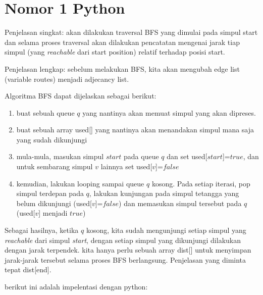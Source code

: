 \documentclass[12pt,letterpaper]{article}
\begin{document}
\section{Nomor 1 Python}
Penjelasan singkat: akan dilakukan traversal BFS yang dimulai pada simpul start dan selama proses traversal
akan dilakukan pencatatan mengenai jarak tiap simpul (yang \textit{reachable} dari start position) relatif terhadap posisi start.
\vline

 Penjelasan lengkap: sebelum melakukan BFS, kita akan mengubah edge list (variable routes) menjadi adjecancy list. 

Algoritma BFS dapat dijelaskan sebagai berikut:
\begin{enumerate}
    \item buat sebuah queue $q$ yang nantinya akan memuat simpul yang akan dipreses.
    \item buat sebuah array used[] yang nantinya akan menandakan simpul mana saja yang sudah dikunjungi
    \item  mula-mula, masukan simpul $start$ pada queue $q$ dan set used[$start$]=$true$, dan untuk sembarang simpul $v$ lainnya set used[$v$]=$false$
    \item kemudian, lakukan looping sampai queue $q$ kosong. Pada setiap iterasi, pop simpul terdepan pada $q$, lakukan kunjungan pada simpul tetangga yang belum dikunjungi (used[$v$]=$false$) dan memasukan simpul tersebut pada $q$ (used[$v$] menjadi $true$)
\end{enumerate}
Sebagai hasilnya, ketika $q$ kosong, kita sudah mengunjungi setiap simpul yang \textit{reachable} dari simpul \textit{start}, dengan setiap simpul yang dikunjungi dilakukan dengan jarak terpendek.
kita hanya perlu sebuah array dist[] untuk menyimpan jarak-jarak tersebut selama proses BFS berlangsung. Penjelasan yang diminta tepat dist[end].

berikut ini adalah impelentasi dengan python:
\end{document}
